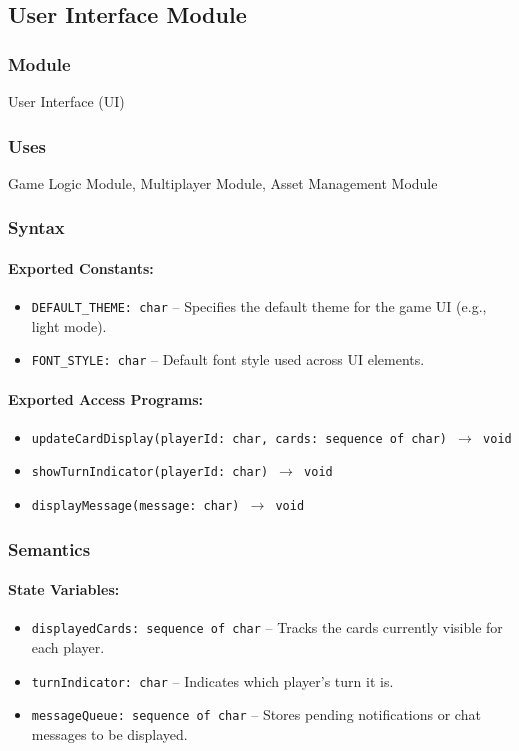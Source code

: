 \documentclass[12pt, titlepage]{article}
\begin{document}
\subsection{User Interface Module}

\subsubsection{Module}
User Interface (UI)

\subsubsection{Uses}
Game Logic Module, Multiplayer Module, Asset Management Module

\subsubsection{Syntax}

\paragraph{Exported Constants:}
\begin{itemize}
    \item \texttt{DEFAULT\_THEME: char} -- Specifies the default theme for the game UI (e.g., light mode).
    \item \texttt{FONT\_STYLE: char} -- Default font style used across UI elements.
\end{itemize}

\paragraph{Exported Access Programs:}
\begin{itemize}
    \item \texttt{updateCardDisplay(playerId: char, cards: sequence of char) $\to$ void}
    \item \texttt{showTurnIndicator(playerId: char) $\to$ void}
    \item \texttt{displayMessage(message: char) $\to$ void}
\end{itemize}

\subsubsection{Semantics}

\paragraph{State Variables:}
\begin{itemize}
    \item \texttt{displayedCards: sequence of char} -- Tracks the cards currently visible for each player.
    \item \texttt{turnIndicator: char} -- Indicates which player's turn it is.
    \item \texttt{messageQueue: sequence of char} -- Stores pending notifications or chat messages to be displayed.
\end{itemize}
\end{document}
